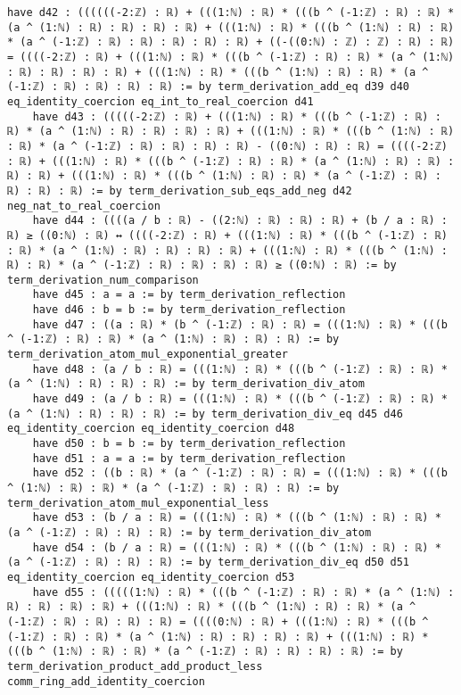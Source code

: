 \documentclass{article}
\begin{document}
\begin{tcolorbox}[colback=white!10, width=\linewidth]
\begin{lstlisting}[language=Lean4]
    have d42 : ((((((-2:ℤ) : ℝ) + (((1:ℕ) : ℝ) * (((b ^ (-1:ℤ) : ℝ) : ℝ) * (a ^ (1:ℕ) : ℝ) : ℝ) : ℝ) : ℝ) + (((1:ℕ) : ℝ) * (((b ^ (1:ℕ) : ℝ) : ℝ) * (a ^ (-1:ℤ) : ℝ) : ℝ) : ℝ) : ℝ) : ℝ) + ((-((0:ℕ) : ℤ) : ℤ) : ℝ) : ℝ) = ((((-2:ℤ) : ℝ) + (((1:ℕ) : ℝ) * (((b ^ (-1:ℤ) : ℝ) : ℝ) * (a ^ (1:ℕ) : ℝ) : ℝ) : ℝ) : ℝ) + (((1:ℕ) : ℝ) * (((b ^ (1:ℕ) : ℝ) : ℝ) * (a ^ (-1:ℤ) : ℝ) : ℝ) : ℝ) : ℝ) := by term_derivation_add_eq d39 d40 eq_identity_coercion eq_int_to_real_coercion d41
    have d43 : (((((-2:ℤ) : ℝ) + (((1:ℕ) : ℝ) * (((b ^ (-1:ℤ) : ℝ) : ℝ) * (a ^ (1:ℕ) : ℝ) : ℝ) : ℝ) : ℝ) + (((1:ℕ) : ℝ) * (((b ^ (1:ℕ) : ℝ) : ℝ) * (a ^ (-1:ℤ) : ℝ) : ℝ) : ℝ) : ℝ) - ((0:ℕ) : ℝ) : ℝ) = ((((-2:ℤ) : ℝ) + (((1:ℕ) : ℝ) * (((b ^ (-1:ℤ) : ℝ) : ℝ) * (a ^ (1:ℕ) : ℝ) : ℝ) : ℝ) : ℝ) + (((1:ℕ) : ℝ) * (((b ^ (1:ℕ) : ℝ) : ℝ) * (a ^ (-1:ℤ) : ℝ) : ℝ) : ℝ) : ℝ) := by term_derivation_sub_eqs_add_neg d42 neg_nat_to_real_coercion
    have d44 : ((((a / b : ℝ) - ((2:ℕ) : ℝ) : ℝ) : ℝ) + (b / a : ℝ) : ℝ) ≥ ((0:ℕ) : ℝ) ↔ ((((-2:ℤ) : ℝ) + (((1:ℕ) : ℝ) * (((b ^ (-1:ℤ) : ℝ) : ℝ) * (a ^ (1:ℕ) : ℝ) : ℝ) : ℝ) : ℝ) + (((1:ℕ) : ℝ) * (((b ^ (1:ℕ) : ℝ) : ℝ) * (a ^ (-1:ℤ) : ℝ) : ℝ) : ℝ) : ℝ) ≥ ((0:ℕ) : ℝ) := by term_derivation_num_comparison
    have d45 : a = a := by term_derivation_reflection
    have d46 : b = b := by term_derivation_reflection
    have d47 : ((a : ℝ) * (b ^ (-1:ℤ) : ℝ) : ℝ) = (((1:ℕ) : ℝ) * (((b ^ (-1:ℤ) : ℝ) : ℝ) * (a ^ (1:ℕ) : ℝ) : ℝ) : ℝ) := by term_derivation_atom_mul_exponential_greater
    have d48 : (a / b : ℝ) = (((1:ℕ) : ℝ) * (((b ^ (-1:ℤ) : ℝ) : ℝ) * (a ^ (1:ℕ) : ℝ) : ℝ) : ℝ) := by term_derivation_div_atom
    have d49 : (a / b : ℝ) = (((1:ℕ) : ℝ) * (((b ^ (-1:ℤ) : ℝ) : ℝ) * (a ^ (1:ℕ) : ℝ) : ℝ) : ℝ) := by term_derivation_div_eq d45 d46 eq_identity_coercion eq_identity_coercion d48
    have d50 : b = b := by term_derivation_reflection
    have d51 : a = a := by term_derivation_reflection
    have d52 : ((b : ℝ) * (a ^ (-1:ℤ) : ℝ) : ℝ) = (((1:ℕ) : ℝ) * (((b ^ (1:ℕ) : ℝ) : ℝ) * (a ^ (-1:ℤ) : ℝ) : ℝ) : ℝ) := by term_derivation_atom_mul_exponential_less
    have d53 : (b / a : ℝ) = (((1:ℕ) : ℝ) * (((b ^ (1:ℕ) : ℝ) : ℝ) * (a ^ (-1:ℤ) : ℝ) : ℝ) : ℝ) := by term_derivation_div_atom
    have d54 : (b / a : ℝ) = (((1:ℕ) : ℝ) * (((b ^ (1:ℕ) : ℝ) : ℝ) * (a ^ (-1:ℤ) : ℝ) : ℝ) : ℝ) := by term_derivation_div_eq d50 d51 eq_identity_coercion eq_identity_coercion d53
    have d55 : (((((1:ℕ) : ℝ) * (((b ^ (-1:ℤ) : ℝ) : ℝ) * (a ^ (1:ℕ) : ℝ) : ℝ) : ℝ) : ℝ) + (((1:ℕ) : ℝ) * (((b ^ (1:ℕ) : ℝ) : ℝ) * (a ^ (-1:ℤ) : ℝ) : ℝ) : ℝ) : ℝ) = ((((0:ℕ) : ℝ) + (((1:ℕ) : ℝ) * (((b ^ (-1:ℤ) : ℝ) : ℝ) * (a ^ (1:ℕ) : ℝ) : ℝ) : ℝ) : ℝ) + (((1:ℕ) : ℝ) * (((b ^ (1:ℕ) : ℝ) : ℝ) * (a ^ (-1:ℤ) : ℝ) : ℝ) : ℝ) : ℝ) := by term_derivation_product_add_product_less comm_ring_add_identity_coercion

\end{lstlisting}
\end{tcolorbox}
\end{document}
